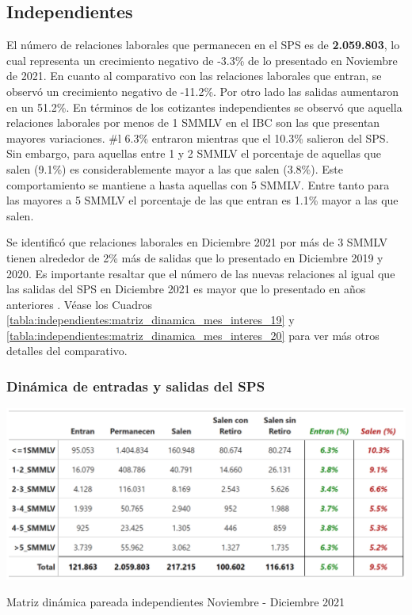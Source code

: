 \subsection{Independientes}

El número de relaciones laborales que permanecen en el SPS es de \textbf{2.059.803}, lo cual representa un crecimiento negativo de -3.3\% de lo presentado en Noviembre de 2021. En cuanto al comparativo con las relaciones laborales que entran, se observó un crecimiento negativo de -11.2\%. Por otro lado las salidas aumentaron en un 51.2\%.  En términos de los cotizantes independientes se observó que aquella relaciones laborales por menos de 1 SMMLV en el IBC son las que presentan mayores variaciones. #l 6.3\% entraron  mientras que el 10.3\% salieron del SPS. Sin embargo, para aquellas entre 1 y 2 SMMLV el porcentaje de aquellas que salen (9.1\%) es considerablemente mayor a las que salen (3.8\%). Este comportamiento se mantiene a hasta aquellas con 5 SMMLV. Entre tanto para las mayores a 5 SMMLV el porcentaje de las que entran es 1.1\% mayor a las que salen. 

Se identificó que relaciones laborales en Diciembre 2021 por más de 3 SMMLV tienen alrededor de 2\% más de salidas que lo presentado en Diciembre 2019 y 2020. Es importante resaltar que el número de las nuevas relaciones al igual que las salidas del SPS en Diciembre 2021 es mayor que lo presentado en años anteriores . Véase los Cuadros \ref{tabla:independientes:matriz_dinamica_mes_interes_19} y \ref{tabla:independientes:matriz_dinamica_mes_interes_20} para ver más otros detalles del comparativo.

\subsubsection{Dinámica de entradas y salidas del SPS}
\begin{table}[!htbp]
\label{tabla:independientes:matriz_dinamica_mes_interes_21}
\centering
\includegraphics[width = 15cm]{results/02_longitudinal/salida_resumen_independientes_interes_21.png}
\caption{Matriz dinámica pareada independientes Noviembre - Diciembre 2021}%
\end{table}

